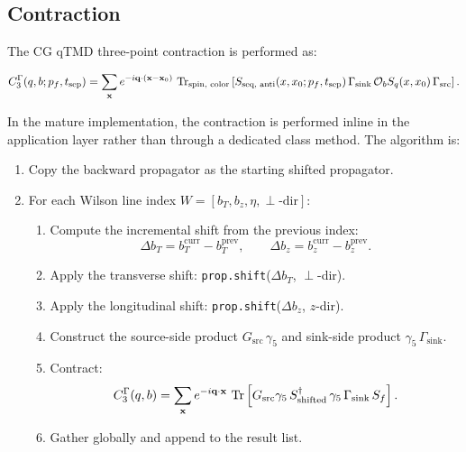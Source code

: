 \documentclass[11pt]{article}
\begin{document}
\subsection{Contraction}

The CG qTMD three-point contraction is performed as:

\begin{equation}
    C_3^{\Gamma}(q, b; p_f, t_{\text{sep}}) = \sum_{\mathbf{x}} e^{-i \mathbf{q} \cdot (\mathbf{x} - \mathbf{x}_0)} \,
    \Tr_{\text{spin, color}} \left[
        S_{\text{seq, anti}}(x, x_0; p_f, t_{\text{sep}}) \,
        \Gamma_{\text{sink}} \,
        \mathcal{O}_b S_q(x, x_0) \,
        \Gamma_{\text{src}}
    \right].
\end{equation}

In the mature implementation, the contraction is performed inline in the application layer rather than through a dedicated class method. The algorithm is:

\begin{enumerate}
    \item Copy the backward propagator as the starting shifted propagator.
    \item For each Wilson line index $W = [b_T, b_z, \eta, \perp\text{-dir}]$:
    \begin{enumerate}
        \item Compute the incremental shift from the previous index:
        \begin{equation}
            \Delta b_T = b_T^{\text{curr}} - b_T^{\text{prev}}, \qquad
            \Delta b_z = b_z^{\text{curr}} - b_z^{\text{prev}}.
        \end{equation}
        \item Apply the transverse shift: \texttt{prop.shift}($\Delta b_T$, $\perp$-dir).
        \item Apply the longitudinal shift: \texttt{prop.shift}($\Delta b_z$, $z$-dir).
        \item Construct the source-side product $G_{\text{src}} \, \gamma_5$ and sink-side product $\gamma_5 \, \Gamma_{\text{sink}}$.
        \item Contract:
        \begin{equation}
            C_3^{\Gamma}(q, b) = \sum_{\mathbf{x}} e^{-i \mathbf{q} \cdot \mathbf{x}} \,
            \Tr \left[ G_{\text{src}} \gamma_5 \, S_{\text{shifted}}^\dagger \, \gamma_5 \, \Gamma_{\text{sink}} \, S_f \right].
        \end{equation}
        \item Gather globally and append to the result list.
    \end{enumerate}
\end{enumerate}
\end{document}
